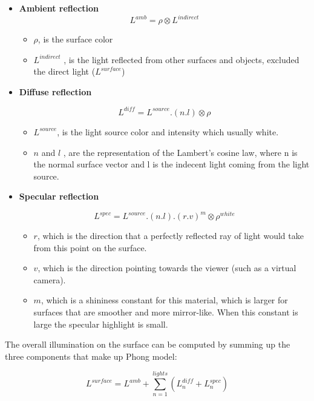 \documentclass{article}
\begin{document}
\begin{itemize}
	\item \textbf{Ambient reflection}
		\begin{equation}
L^{amb} = \rho \otimes L^{indirect}
		\end{equation}
	
	\begin{itemize}
		\item $\rho$, is the surface color
		\item $L^{indirect}$ , is the light reflected from other surfaces and objects, excluded the direct light ($L^{surface}$)
	\end{itemize}
	\item \textbf{Diffuse reflection} 

					\begin{equation}
L^{diff} =  L^{source}.(n.l) \otimes \rho 
			\end{equation}
				\begin{itemize}
		\item $L^{source}$, is the light source color and intensity which usually white. 
		\item $n$ and $l$ , are the representation of the Lambert's cosine law, where n is the normal surface vector  and l is the indecent light coming from the light source.
	\end{itemize}
	\item \textbf{Specular reflection} 

								\begin{equation}
L^{spec} =  L^{source}.(n.l).(r.v)^m \otimes \rho^{white} 
			\end{equation}
				\begin{itemize}
		\item $r$, which is the direction that a perfectly reflected ray of light would take from this point on the surface. 
		\item $v$, which is the direction pointing towards the viewer (such as a virtual camera).
		\item $m$, which is a shininess constant for this material, which is larger for surfaces that are smoother and more mirror-like. When this constant is large the specular highlight is small.
	\end{itemize}
\end{itemize}

The overall illumination on the surface can be computed by summing up the three components that make up Phong model:

\begin{equation}
	L^{surface}= L^{amb} + \sum_{n=1}^{lights} (L_n^{diff} + L_n^{spec})
\end{equation}
\end{document}
